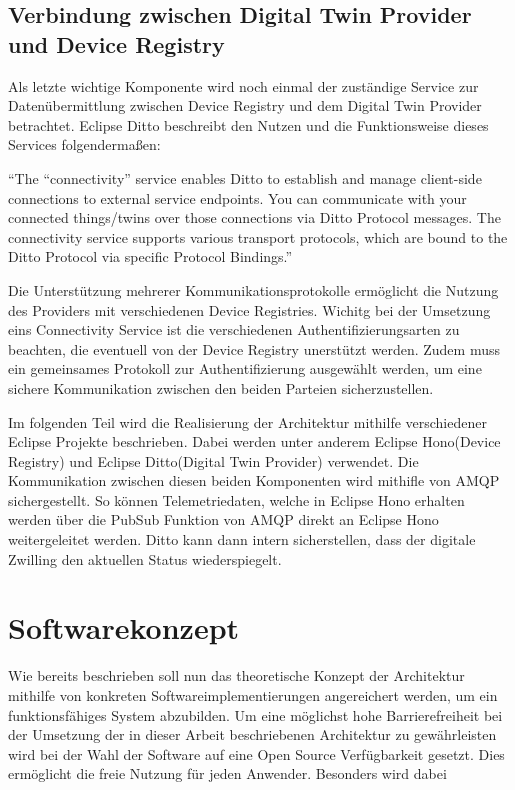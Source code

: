 \subsection{Verbindung zwischen Digital Twin Provider und Device Registry}

Als letzte wichtige Komponente wird noch einmal der zuständige Service zur Datenübermittlung zwischen Device Registry und dem Digital Twin Provider betrachtet. Eclipse Ditto beschreibt den Nutzen und die Funktionsweise dieses Services folgendermaßen:

\enquote{The “connectivity” service enables Ditto to establish and manage client-side connections to external service endpoints. You can communicate with your connected things/twins over those connections via Ditto Protocol messages. The connectivity service supports various transport protocols, which are bound to the Ditto Protocol via specific Protocol Bindings.}\autocite{ditto}

Die Unterstützung mehrerer Kommunikationsprotokolle ermöglicht die Nutzung des Providers mit verschiedenen Device Registries. Wichitg bei der Umsetzung eins Connectivity Service ist die verschiedenen Authentifizierungsarten zu beachten, die eventuell von der Device Registry unerstützt werden. Zudem muss ein gemeinsames Protokoll zur Authentifizierung ausgewählt werden, um eine sichere Kommunikation zwischen den beiden Parteien sicherzustellen.

Im folgenden Teil wird die Realisierung der Architektur mithilfe verschiedener Eclipse Projekte beschrieben. Dabei werden unter anderem Eclipse Hono(Device Registry) und Eclipse Ditto(Digital Twin Provider) verwendet. Die Kommunikation zwischen diesen beiden Komponenten wird mithifle von \ac{AMQP} sichergestellt. So können Telemetriedaten, welche in Eclipse Hono erhalten werden über die PubSub Funktion von AMQP direkt an Eclipse Hono weitergeleitet werden. Ditto kann dann intern sicherstellen, dass der digitale Zwilling den aktuellen Status wiederspiegelt.

\clearpage
\section{Softwarekonzept}

Wie bereits beschrieben soll nun das theoretische Konzept der Architektur mithilfe von konkreten Softwareimplementierungen angereichert werden, um ein funktionsfähiges System abzubilden. Um eine möglichst hohe Barrierefreiheit bei der Umsetzung der in dieser Arbeit beschriebenen Architektur zu gewährleisten wird bei der Wahl der Software auf eine Open Source Verfügbarkeit gesetzt. Dies ermöglicht die freie Nutzung für jeden Anwender. Besonders wird dabei 

